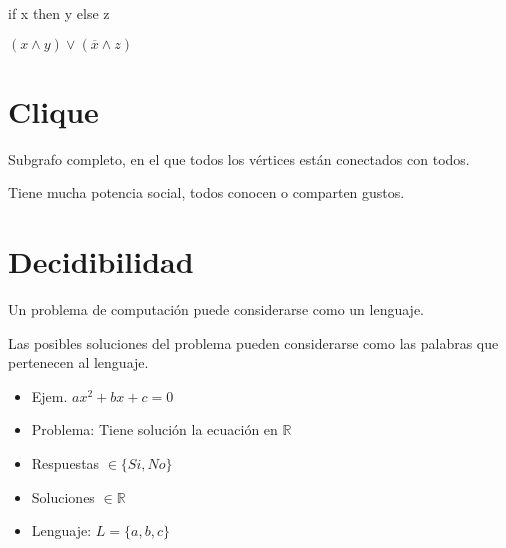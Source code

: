 if x then y else z

$(x \wedge y) \vee (\overline{x} \wedge z)$

\section{Clique}
Subgrafo completo, en el que todos los vértices están conectados con todos.

Tiene mucha potencia social, todos conocen o comparten gustos.

\section{Decidibilidad}
Un problema de computación puede considerarse como un lenguaje.

Las posibles soluciones del problema pueden considerarse como las palabras que pertenecen al lenguaje.
\begin{itemize}
    \item Ejem. $ax^2+bx+c=0$
    \item Problema: Tiene solución la ecuación en $\mathbb{R}$
    \item Respuestas $\in \{Si, No\}$
    \item Soluciones $\in \mathbb{R}$
    \item Lenguaje: $L= \{a,b,c\}$
\end{itemize}

